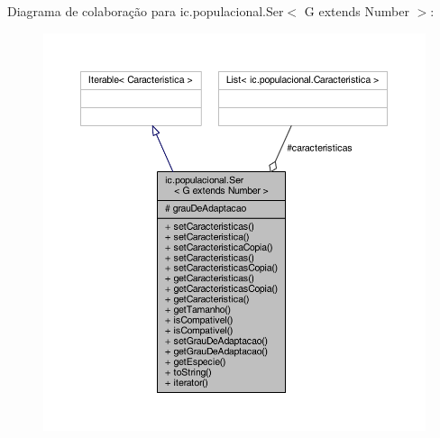 Diagrama de colaboração para ic.\-populacional.\-Ser$<$ G extends Number $>$\-:\nopagebreak
\begin{figure}[H]
\begin{center}
\leavevmode
\includegraphics[width=350pt]{classic_1_1populacional_1_1_ser_3_01_g_01extends_01_number_01_4__coll__graph}
\end{center}
\end{figure}
